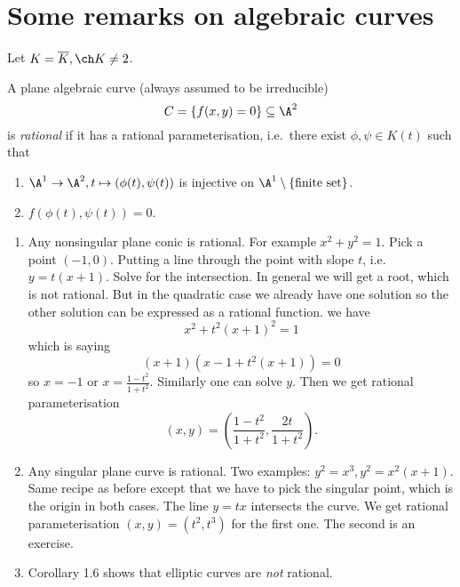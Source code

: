 \documentclass[a4paper]{article}
\theoremstyle{definition}
\theoremstyle{theorem}
\begin{document}
\section{Some remarks on algebraic curves}

Let \(K = \overline K, \ch K \neq 2\).

\begin{definition}
  A plane algebraic curve (always assumed to be irreducible)
  \[
    C = \{f(x, y) = 0\} \subseteq \A^2
  \]
  is \emph{rational} if it has a rational parameterisation, i.e.\ there exist \(\phi, \psi \in K(t)\) such that
  \begin{enumerate}
  \item \(\A^1 \to \A^2, t \mapsto (\phi(t), \psi(t))\) is injective on \(\A^1 \setminus \{\text{finite set}\}\).
  \item \(f(\phi(t), \psi(t)) = 0\).
  \end{enumerate}
\end{definition}

\begin{eg}\leavevmode
  \begin{enumerate}
  \item Any nonsingular plane conic is rational. For example \(x^2 + y^2 = 1\). Pick a point \((-1, 0)\). Putting a line through the point with slope \(t\), i.e.\ \(y = t(x + 1)\). Solve for the intersection. In general we will get a root, which is not rational. But in the quadratic case we already have one solution so the other solution can be expressed as a rational function. we have
    \[
      x^2 + t^2(x + 1)^2 = 1
    \]
    which is saying
    \[
      (x + 1)(x - 1 + t^2(x + 1)) = 0
    \]
    so \(x = -1\) or \(x = \frac{1 - t^2}{1 + t^2}\). Similarly one can solve \(y\). Then we get rational parameterisation
    \[
      (x, y) = \left( \frac{1 - t^2}{1 + t^2}, \frac{2t}{1 + t^2} \right).
    \]
  \item Any singular plane curve is rational. Two examples: \(y^2 = x^3, y^2 = x^2 (x + 1)\). Same recipe as before except that we have to pick the singular point, which is the origin in both cases. The line \(y = tx\) intersects the curve. We get rational parameterisation \((x, y) = (t^2, t^3)\) for the first one. The second is an exercise.
  \item Corollary 1.6 shows that elliptic curves are \emph{not} rational.
  \end{enumerate}
\end{eg}
\end{document}

